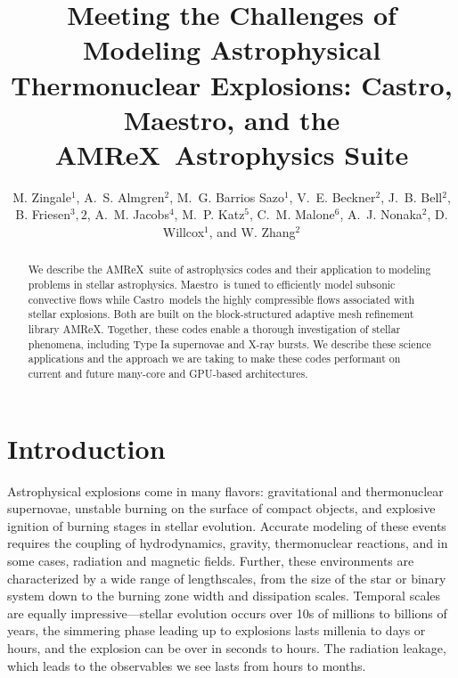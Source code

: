 \documentclass[a4paper]{jpconf}
\newcommand{\maestro}{{\sffamily Maestro}}
\newcommand{\castro}{{\sffamily Castro}}
\newcommand{\amrex}{{\sffamily AMReX}}
\begin{document}
\title{Meeting the Challenges of Modeling Astrophysical Thermonuclear Explosions:
\castro, \maestro, and the \amrex\ Astrophysics Suite}

\author{M. Zingale$^1$,
        A.~S. Almgren$^2$,
        M.~G. Barrios Sazo$^1$,
        V.~E. Beckner$^2$,
        J.~B. Bell$^2$,
        B. Friesen$^3,2$,
        A.~M. Jacobs$^4$,
        M.~P. Katz$^5$,
        C.~M. Malone$^6$,
        A.~J. Nonaka$^2$,
        D. Willcox$^1$, and
        W. Zhang$^2$}

\address{$^1$Department of Physics and Astronomy, Stony Brook
  University, Stony Brook, NY 11794-3800 USA}

\address{$^2$Center for Computational Sciences and Engineering,
  Lawrence Berkeley National Lab, Berkeley, CA 94720 USA}

\address{$^3$National Energy Research Scientific Computing Center,
  Lawrence Berkeley National Lab, Berkeley, CA 94720 USA}

\address{$^4$Department of Physics and Astronomy, Michigan State
  University, East Lansing, Michigan 48824 USA}

\address{$^5$Nvidia Corporation}

\address{$^6$Los Alamos National Laboratory, Los Alamos, NM, 87545 USA}

\begin{abstract}
We describe the \amrex\ suite of astrophysics codes and their
application to modeling problems in stellar astrophysics.
\maestro\ is tuned to efficiently model subsonic convective flows
while \castro\ models the highly compressible flows associated with
stellar explosions.  Both are built on the block-structured adaptive
mesh refinement library \amrex.  Together, these codes enable a
thorough investigation of stellar phenomena, including Type Ia
supernovae and X-ray bursts.  We describe these science applications
and the approach we are taking to make these codes performant on
current and future many-core and GPU-based architectures.
\end{abstract}




\section{Introduction}

Astrophysical explosions come in many flavors: gravitational and
thermonuclear supernovae, unstable burning on the surface of compact
objects, and explosive ignition of burning stages in stellar
evolution.  Accurate modeling of these events requires the coupling of
hydrodynamics, gravity, thermonuclear reactions, and in some cases,
radiation and magnetic fields.  Further, these environments are
characterized by a wide range of lengthscales, from the size of the
star or binary system down to the burning zone width and dissipation
scales.  Temporal scales are equally impressive---stellar evolution
occurs over 10s of millions to billions of years, the simmering phase
leading up to explosions lasts millenia to days or hours, and the
explosion can be over in seconds to hours.  The radiation leakage,
which leads to the observables we see lasts from hours to months.
\end{document}
